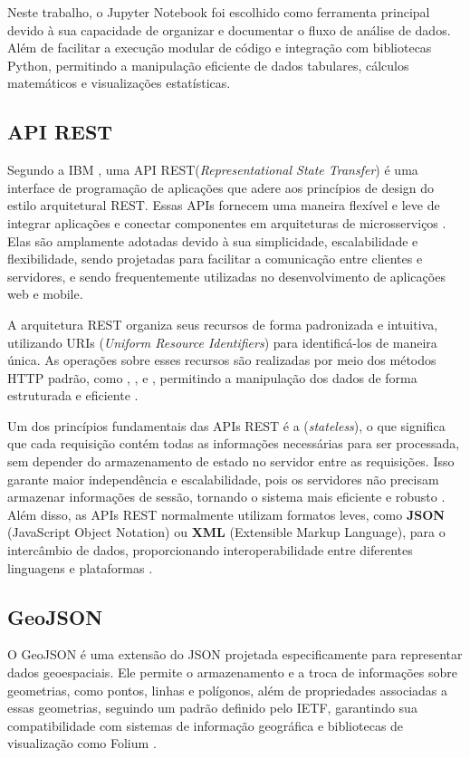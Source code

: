 Neste trabalho, o Jupyter Notebook foi escolhido como ferramenta principal devido à sua capacidade de organizar e documentar o fluxo de análise de dados. Além de facilitar a execução modular de código e integração com bibliotecas Python, permitindo a manipulação eficiente de dados tabulares, cálculos matemáticos e visualizações estatísticas.

\subsection{API REST}
Segundo a IBM \cite{ibm_rest_api}, uma \acrshort{API} \acrfull{REST}(\textit{Representational State Transfer}) é uma interface de programação de aplicações que adere aos princípios de design do estilo arquitetural \acrshort{REST}. Essas \acrshort{API}s fornecem uma maneira flexível e leve de integrar aplicações e conectar componentes em arquiteturas de microsserviços \cite{ibm_rest_api}. Elas são amplamente adotadas devido à sua simplicidade, escalabilidade e flexibilidade, sendo projetadas para facilitar a comunicação entre clientes e servidores, e sendo frequentemente utilizadas no desenvolvimento de aplicações web e mobile.

A arquitetura \acrshort{REST} organiza seus recursos de forma padronizada e intuitiva, utilizando URIs (\textit{Uniform Resource Identifiers}) para identificá-los de maneira única. As operações sobre esses recursos são realizadas por meio dos métodos HTTP padrão, como , ,  e , permitindo a manipulação dos dados de forma estruturada e eficiente \cite{restfulapi_statelessness}.

Um dos princípios fundamentais das \acrshort{API}s REST é a  (\textit{stateless}), o que significa que cada requisição contém todas as informações necessárias para ser processada, sem depender do armazenamento de estado no servidor entre as requisições. Isso garante maior independência e escalabilidade, pois os servidores não precisam armazenar informações de sessão, tornando o sistema mais eficiente e robusto \cite{restfulapi_statelessness}. Além disso, as \acrshort{API}s \acrshort{REST} normalmente utilizam formatos leves, como \textbf{JSON} (JavaScript Object Notation) ou \textbf{XML} (Extensible Markup Language), para o intercâmbio de dados, proporcionando interoperabilidade entre diferentes linguagens e plataformas \cite{ibm_rest_api}. 


\subsection{GeoJSON}
O GeoJSON é uma extensão do JSON projetada especificamente para representar dados geoespaciais. Ele permite o armazenamento e a troca de informações sobre geometrias, como pontos, linhas e polígonos, além de propriedades associadas a essas geometrias, seguindo um padrão definido pelo \acrfull{IETF}, garantindo sua compatibilidade com sistemas de informação geográfica e bibliotecas de visualização como Folium \cite{geojson_specification}.


